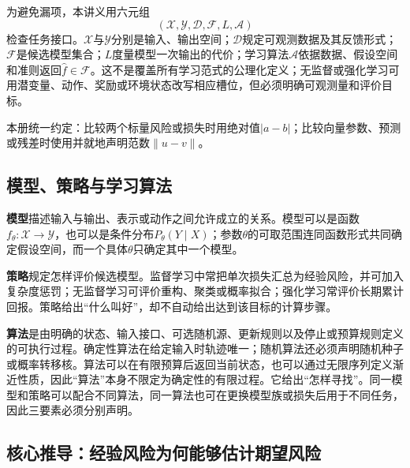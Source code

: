 \begin{keypointbox}[title=本讲义的工作性检查框架]\label{def:V1-C09-learning-problem}\label{schema:V1-C09:CH-07}
为避免漏项，本讲义用六元组
\[
(\mathcal X,\mathcal Y,\mathcal D,\mathcal F,L,\mathcal A)
\]
检查任务接口。$\mathcal X$与$\mathcal Y$分别是输入、输出空间；$\mathcal D$规定可观测数据及其反馈形式；$\mathcal F$是候选模型集合；$L$度量模型一次输出的代价；学习算法$\mathcal A$依据数据、假设空间和准则返回$\widehat f\in\mathcal F$。这不是覆盖所有学习范式的公理化定义；无监督或强化学习可用潜变量、动作、奖励或环境状态改写相应槽位，但必须明确可观测量和评价目标。
\end{keypointbox}

本册统一约定：比较两个标量风险或损失时用绝对值$|a-b|$；比较向量参数、预测或残差时使用并就地声明范数$\|u-v\|$。

\subsection*{模型、策略与学习算法}
\label{schema:V1-C09:CH-08}
\textbf{模型}描述输入与输出、表示或动作之间允许成立的关系。模型可以是函数$f_\theta:\mathcal X\to\mathcal Y$，也可以是条件分布$P_\theta(Y\mid X)$；参数$\theta$的可取范围连同函数形式共同确定假设空间，而一个具体$\theta$只确定其中一个模型。

\label{schema:V1-C09:CH-09}
\textbf{策略}规定怎样评价候选模型。监督学习中常把单次损失汇总为经验风险，并可加入复杂度惩罚；无监督学习可评价重构、聚类或概率拟合；强化学习常评价长期累计回报。策略给出“什么叫好”，却不自动给出达到该目标的计算步骤。

\label{schema:V1-C09:CH-10}
\textbf{算法}是由明确的状态、输入接口、可选随机源、更新规则以及停止或预算规则定义的可执行过程。确定性算法在给定输入时轨迹唯一；随机算法还必须声明随机种子或概率转移核。算法可以在有限预算后返回当前状态，也可以通过无限序列定义渐近性质，因此“算法”本身不限定为确定性的有限过程。它给出“怎样寻找”。同一模型和策略可以配合不同算法，同一算法也可在更换模型族或损失后用于不同任务，因此三要素必须分别声明。

\subsection*{核心推导：经验风险为何能够估计期望风险}


